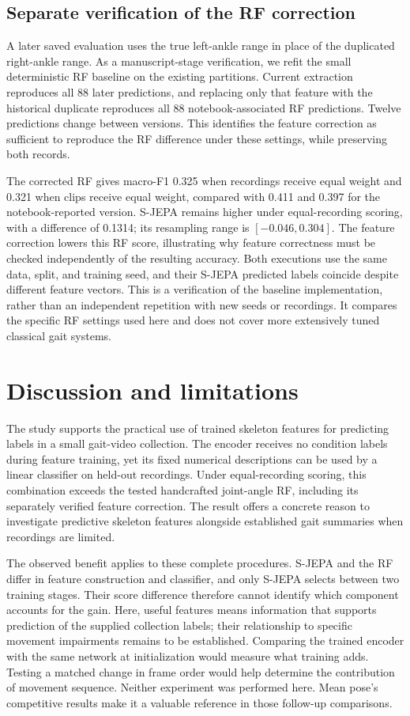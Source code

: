 \documentclass[10pt,twocolumn,letterpaper]{article}
\begin{document}
\subsection{Separate verification of the RF correction}
A later saved evaluation uses the true left-ankle range in place of the duplicated right-ankle range. As a manuscript-stage verification, we refit the small deterministic RF baseline on the existing partitions. Current extraction reproduces all 88 later predictions, and replacing only that feature with the historical duplicate reproduces all 88 notebook-associated RF predictions. Twelve predictions change between versions. This identifies the feature correction as sufficient to reproduce the RF difference under these settings, while preserving both records.

The corrected RF gives macro-F1 0.325 when recordings receive equal weight and 0.321 when clips receive equal weight, compared with 0.411 and 0.397 for the notebook-reported version. S-JEPA remains higher under equal-recording scoring, with a difference of 0.1314; its resampling range is $[-0.046,0.304]$. The feature correction lowers this RF score, illustrating why feature correctness must be checked independently of the resulting accuracy. Both executions use the same data, split, and training seed, and their S-JEPA predicted labels coincide despite different feature vectors. This is a verification of the baseline implementation, rather than an independent repetition with new seeds or recordings. It compares the specific RF settings used here and does not cover more extensively tuned classical gait systems.

\section{Discussion and limitations}
The study supports the practical use of trained skeleton features for predicting labels in a small gait-video collection. The encoder receives no condition labels during feature training, yet its fixed numerical descriptions can be used by a linear classifier on held-out recordings. Under equal-recording scoring, this combination exceeds the tested handcrafted joint-angle RF, including its separately verified feature correction. The result offers a concrete reason to investigate predictive skeleton features alongside established gait summaries when recordings are limited.

The observed benefit applies to these complete procedures. S-JEPA and the RF differ in feature construction and classifier, and only S-JEPA selects between two training stages. Their score difference therefore cannot identify which component accounts for the gain. Here, useful features means information that supports prediction of the supplied collection labels; their relationship to specific movement impairments remains to be established. Comparing the trained encoder with the same network at initialization would measure what training adds. Testing a matched change in frame order would help determine the contribution of movement sequence. Neither experiment was performed here. Mean pose's competitive results make it a valuable reference in those follow-up comparisons.
\end{document}
